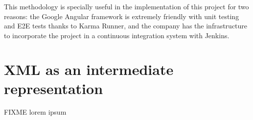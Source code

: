 This methodology is specially useful in the implementation of this project for two reasons: 
the Google Angular framework is extremely friendly with unit testing and \ac{E2E} tests thanks to Karma Runner, and the company has the infrastructure to incorporate the project in a continuous integration system with Jenkins.

\section{XML as an intermediate representation}
FIXME
lorem ipsum

